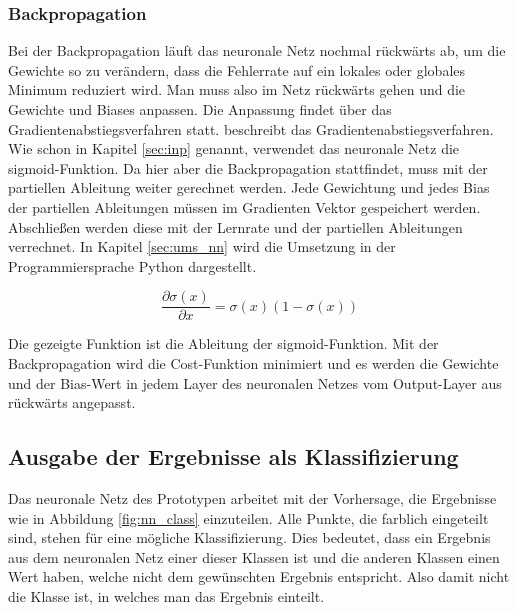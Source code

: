 \subsubsection{Backpropagation}
Bei der Backpropagation läuft das neuronale Netz nochmal rückwärts ab, um die Gewichte so zu verändern, dass die Fehlerrate auf ein lokales oder globales Minimum reduziert wird. Man muss also im Netz rückwärts gehen und die Gewichte und Biases anpassen. Die Anpassung findet über das Gradientenabstiegsverfahren statt. \citep{Rey2011} beschreibt das Gradientenabstiegsverfahren. Wie schon in Kapitel \ref{sec:inp} genannt, verwendet das neuronale Netz die sigmoid-Funktion. Da hier aber die Backpropagation stattfindet, muss mit der partiellen Ableitung weiter gerechnet werden. Jede Gewichtung und jedes Bias der partiellen Ableitungen müssen im Gradienten Vektor gespeichert werden. Abschließen werden diese mit der Lernrate und der partiellen Ableitungen verrechnet. In Kapitel \ref{sec:ums_nn} wird die Umsetzung in der Programmiersprache Python dargestellt.
\newline

\[\displaystyle \frac{\partial \sigma(x)}{\partial x} = \sigma(x)(1-\sigma(x))\]

\newline
\newline
Die gezeigte Funktion ist die Ableitung der sigmoid-Funktion. Mit der Backpropagation wird die Cost-Funktion minimiert und es werden die Gewichte und der Bias-Wert in jedem Layer des neuronalen Netzes vom Output-Layer aus rückwärts angepasst.

\subsection{Ausgabe der Ergebnisse als Klassifizierung}
Das neuronale Netz des Prototypen arbeitet mit der Vorhersage, die Ergebnisse wie in Abbildung \ref{fig:nn_class} einzuteilen. Alle Punkte, die farblich eingeteilt sind, stehen für eine mögliche Klassifizierung. Dies bedeutet, dass ein Ergebnis aus dem neuronalen Netz einer dieser Klassen ist und die anderen Klassen einen Wert haben, welche nicht dem gewünschten Ergebnis entspricht. Also damit nicht die Klasse ist, in welches man das Ergebnis einteilt.

